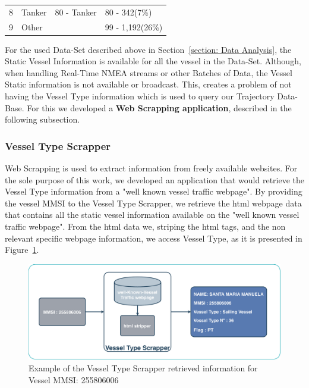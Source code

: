 \begin{table}[H]
\begin{tabular}{@{}clll@{}}
8           & Tanker                                                  & 80 - Tanker                                                & 80 - 342(7\%)                                                                           \\
9           & Other                                                   &                                                            & 99 - 1,192(26\%)                                                                         \\ \bottomrule
\end{tabular}
\end{table}

For the used Data-Set described above in Section~\ref{section: Data Analysis}, the Static Vessel Information is available for all the vessel in the Data-Set. Although, when handling Real-Time NMEA streams or other Batches of Data, the Vessel Static information is not available or broadcast. This, creates a problem of not having the Vessel Type information which is used to query our Trajectory Data-Base.
For this we developed a \textbf{Web Scrapping application}, described in the following subsection.

\subsubsection{Vessel Type Scrapper}
Web Scrapping is used to extract information from freely available websites. For the sole purpose of this work, we developed an application that would retrieve the Vessel Type information from a "well known vessel traffic webpage".
By providing the vessel MMSI to the Vessel Type Scrapper, we retrieve the html webpage data that contains all the static vessel information available on the "well known vessel traffic webpage". From the html data we, striping the html tags, and the non relevant specific webpage information, we access Vessel Type, as it is presented in Figure~\ref{fig:Scraper}.

\begin{figure}[H]
\centering
\includegraphics[width=\textwidth]{figures/Ch4/scrapper}
\caption{Example of the Vessel Type Scrapper retrieved information for Vessel MMSI: 255806006}
\label{fig:Scraper}
\end{figure}


